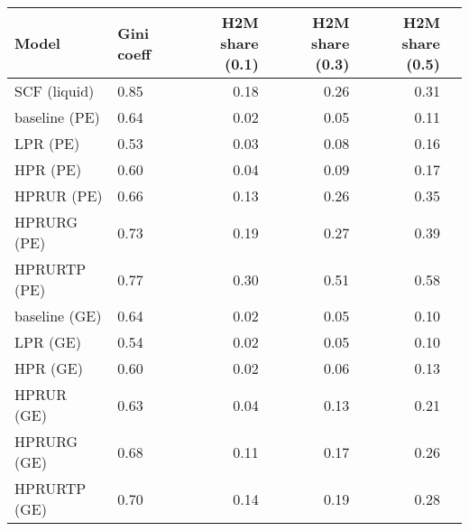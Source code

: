 \begin{tabular}{llrrrr}
\hline \hline 
     Model &  Gini coeff &  H2M share (0.1) &  H2M share (0.3) &  H2M share (0.5) \\
\hline 
   SCF (liquid) &        0.85 &             0.18 &             0.26 &             0.31 \\
\hline 
  baseline (PE) &        0.64 &             0.02 &             0.05 &             0.11 \\
      LPR (PE) &        0.53 &             0.03 &             0.08 &             0.16 \\
      HPR (PE) &        0.60 &             0.04 &             0.09 &             0.17 \\
    HPRUR (PE) &        0.66 &             0.13 &             0.26 &             0.35 \\
   HPRURG (PE) &        0.73 &             0.19 &             0.27 &             0.39 \\
  HPRURTP (PE) &        0.77 &             0.30 &             0.51 &             0.58 \\
\hline 
\hline 
 baseline (GE) &        0.64 &             0.02 &             0.05 &             0.10 \\
     LPR (GE) &        0.54 &             0.02 &             0.05 &             0.10 \\
     HPR (GE) &        0.60 &             0.02 &             0.06 &             0.13 \\
   HPRUR (GE) &        0.63 &             0.04 &             0.13 &             0.21 \\
  HPRURG (GE) &        0.68 &             0.11 &             0.17 &             0.26 \\
  HPRURTP (GE) &        0.70 &             0.14 &             0.19 &             0.28 \\
\hline \hline 
\end{tabular}
